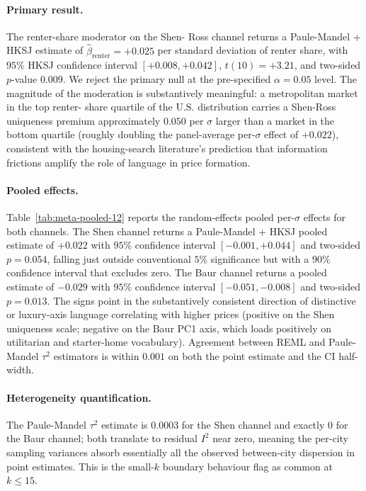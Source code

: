 \paragraph{Primary result.} The renter-share moderator on the Shen-
Ross channel returns a Paule-Mandel + HKSJ estimate of
$\hat\beta_{\mathrm{renter}} = +0.025$ per standard deviation of
renter share, with $95\%$ HKSJ confidence interval
$[+0.008, +0.042]$, $t(10) = +3.21$, and two-sided $p$-value
$0.009$.  We reject the primary null at the pre-specified
$\alpha = 0.05$ level.  The magnitude of the moderation is
substantively meaningful: a metropolitan market in the top renter-
share quartile of the U.S. distribution carries a Shen-Ross
uniqueness premium approximately $0.050$ per $\sigma$ larger than a
market in the bottom quartile (roughly doubling the panel-average
per-$\sigma$ effect of $+0.022$), consistent with the housing-search
literature's prediction that information frictions amplify the role
of language in price formation.

\paragraph{Pooled effects.} Table~\ref{tab:meta-pooled-12} reports
the random-effects pooled per-$\sigma$ effects for both channels.
The Shen channel returns a Paule-Mandel + HKSJ pooled estimate of
$+0.022$ with $95\%$ confidence interval $[-0.001, +0.044]$ and
two-sided $p = 0.054$, falling just outside conventional $5\%$
significance but with a $90\%$ confidence interval that excludes
zero.  The Baur channel returns a pooled estimate of $-0.029$ with
$95\%$ confidence interval $[-0.051, -0.008]$ and two-sided
$p = 0.013$.  The signs point in the substantively consistent
direction of distinctive or luxury-axis language correlating with
higher prices (positive on the Shen uniqueness scale; negative on
the Baur PC1 axis, which loads positively on utilitarian and
starter-home vocabulary).  Agreement between REML and Paule-Mandel
$\tau^2$ estimators is within $0.001$ on both the point estimate
and the CI half-width.

\paragraph{Heterogeneity quantification.} The Paule-Mandel
$\tau^2$ estimate is $0.0003$ for the Shen channel and exactly $0$
for the Baur channel; both translate to residual $I^2$ near zero,
meaning the per-city sampling variances absorb essentially all the
observed between-city dispersion in point estimates.  This is the
small-$k$ boundary behaviour \citet{veroniki2016methods} flag as
common at $k \leq 15$.


